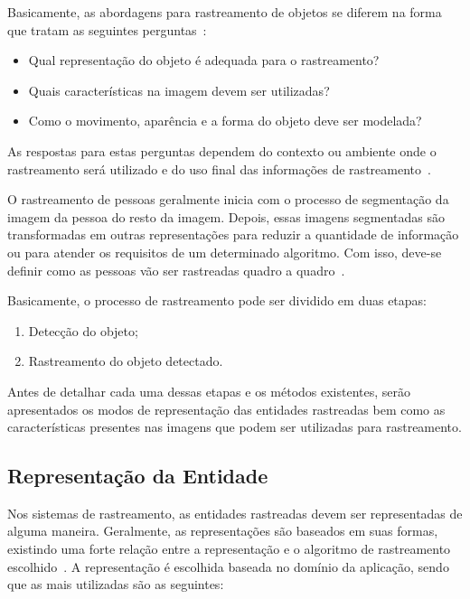 	Basicamente, as abordagens para rastreamento de objetos se diferem na forma que tratam as seguintes perguntas~\cite{yilmaz}: 
		
		\begin{itemize}
			\item Qual representação do objeto é adequada para o rastreamento?
			\item Quais características na imagem devem ser utilizadas?
			\item Como o movimento, aparência e a forma do objeto deve ser modelada? 
		\end{itemize}

	As respostas para estas perguntas dependem do contexto ou ambiente onde o rastreamento será utilizado e do uso final das informações de rastreamento~\cite{yilmaz}.

	O rastreamento de pessoas geralmente inicia com o processo de segmentação da
	imagem da pessoa do resto da imagem. Depois, essas imagens segmentadas são
	transformadas em outras representações para reduzir a quantidade de informação
	ou para atender os requisitos de um determinado algoritmo. Com isso, deve-se definir como as
	pessoas vão ser rastreadas quadro a quadro~\cite{moeslund}.

	Basicamente, o processo de rastreamento pode ser dividido em duas etapas:

		\begin{enumerate}
			\item Detecção do objeto;
			\item Rastreamento do objeto detectado.
		\end{enumerate}

	Antes de detalhar cada uma dessas etapas e os métodos existentes, serão apresentados os modos de representação das entidades rastreadas bem como as características presentes nas imagens que podem ser utilizadas para rastreamento.


\subsection{Representação da Entidade}
\label{sec:representacao-objeto}

	Nos sistemas de rastreamento, as entidades rastreadas devem ser representadas de alguma maneira. Geralmente, as representações são baseados em suas formas, existindo uma forte relação entre a representação e o algoritmo de rastreamento escolhido~\cite{yilmaz}. A representação é escolhida baseada no domínio da aplicação, sendo que as mais utilizadas são as seguintes:

